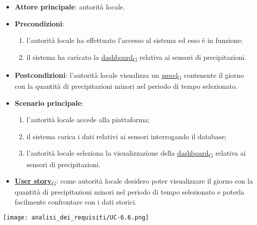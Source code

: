 \newpage

\begin{itemize}
	\item \textbf{Attore principale}: autorità locale.
	\item \textbf{Precondizioni}:
	      \begin{enumerate}
		      \item l'autorità locale ha effettuato l'accesso al sistema ed esso è in funzione;
		      \item il sistema ha caricato la \href{https://7last.github.io/docs/rtb/documentazione-interna/glossario\#dashboard}{dashboard\textsubscript{G}} relativa ai sensori di precipitazioni.
	      \end{enumerate}
	\item \textbf{Postcondizioni}: l'autorità locale visualizza un \href{https://7last.github.io/docs/rtb/documentazione-interna/glossario\#panel}{\textit{panel}\textsubscript{G}} contenente il giorno con la quantità di precipitazioni minori nel periodo di tempo selezionato.
	\item \textbf{Scenario principale}:
	      \begin{enumerate}
		      \item l'autorità locale accede alla piattaforma;
		      \item il sistema carica i dati relativi ai sensori interrogando il database;
		      \item l'autorità locale seleziona la visualizzazione della \href{https://7last.github.io/docs/rtb/documentazione-interna/glossario\#dashboard}{dashboard\textsubscript{G}} relativa ai sensori di precipitazioni.
	      \end{enumerate}
	\item \href{https://7last.github.io/docs/rtb/documentazione-interna/glossario\#user-story}{\textbf{User story}\textsubscript{G}}:
	      come autorità locale desidero poter visualizzare il giorno con la quantità di precipitazioni minori nel periodo di tempo selezionato
	      e poterla facilmente confrontare con i dati storici.
\end{itemize}
\begin{center}
	\texttt{[image: analisi\_dei\_requisiti/UC-6.6.png]}
\end{center}


